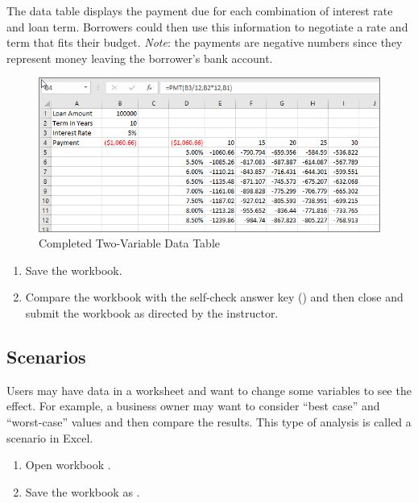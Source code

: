 The data table displays the payment due for each combination of interest rate and loan term. Borrowers could then use this information to negotiate a rate and term that fits their budget. \textit{Note}: the payments are negative numbers since they represent money leaving the borrower's bank account.

\begin{figure}[H]
	\centering
	\includegraphics[width=\maxwidth{.95\linewidth}]{gfx/ch08_fig45}
	\caption{Completed Two-Variable Data Table}
	\label{08:fig45}
\end{figure}

\begin{enumbox}
	\begin{enumerate}
		\item Save the  workbook.
		\item Compare the workbook with the self-check answer key () and then close and submit the  workbook as directed by the instructor.
	\end{enumerate}
\end{enumbox}

\subsection{Scenarios}

Users may have data in a worksheet and want to change some variables to see the effect. For example, a business owner may want to consider ``best case'' and ``worst-case'' values and then compare the results. This type of analysis is called a scenario in Excel.

\begin{enumbox}
	\begin{enumerate}
		\item Open workbook .
		\item Save the workbook as .
	\end{enumerate}
\end{enumbox}

